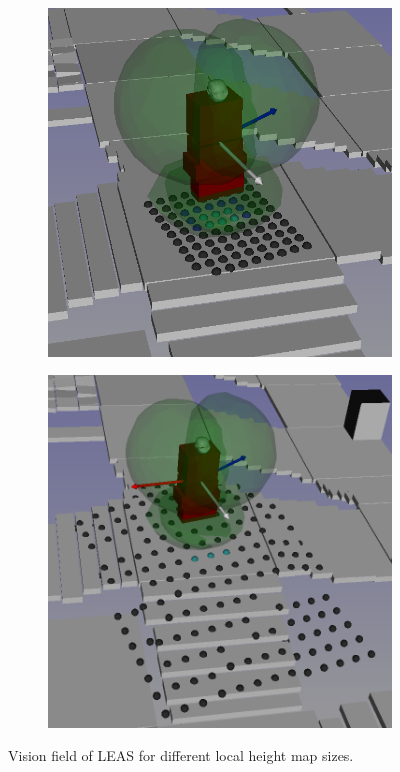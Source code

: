 \begin{figure}[t]
    \captionsetup[subfigure]{justification=centering}
    \begin{subfigure}[t]{.49\linewidth}
    \includegraphics[width=\textwidth]{Figures/Chapter_LEAS/hm_small_vision.png}
    \caption{\label{fig:vision_hm_size_short}}
    \end{subfigure}
    \begin{subfigure}[t]{.49\linewidth}
    \includegraphics[width=\textwidth]{Figures/Chapter_LEAS/hm_big_vision.png}
    \caption{\label{fig:vision_hm_size_big}}
    \end{subfigure}
    \caption{Vision field of LEAS for different local height map sizes.}
    \label{fig:vision_hm_size}
\end{figure}

